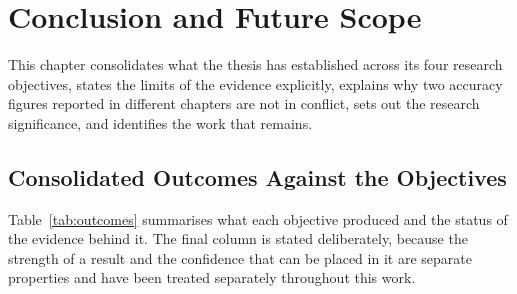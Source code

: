 \chapter{Conclusion and Future Scope}
\label{ch:conclusion}

This chapter consolidates what the thesis has established across its four research objectives,
states the limits of the evidence explicitly, explains why two accuracy figures reported in
different chapters are not in conflict, sets out the research significance, and identifies the
work that remains.

\section{Consolidated Outcomes Against the Objectives}
\label{sec:concl-outcomes}

Table~\ref{tab:outcomes} summarises what each objective produced and the status of the evidence
behind it. The final column is stated deliberately, because the strength of a result and the
confidence that can be placed in it are separate properties and have been treated separately
throughout this work.

